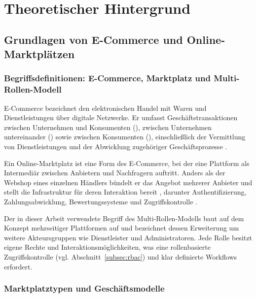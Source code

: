 \chapter{Theoretischer Hintergrund}
\label{chap:theoretischer-hintergrund}

\section{Grundlagen von E-Commerce und Online-Marktplätzen}
\label{sec:grundlagen-ecommerce}

\subsection{Begriffsdefinitionen: E-Commerce, Marktplatz und
Multi-Rollen-Modell}
\label{subsec:begriffe}

E-Commerce bezeichnet den elektronischen Handel mit Waren und
Dienstleistungen über digitale Netzwerke. Er umfasst
Geschäftstransaktionen zwischen Unternehmen und Konsumenten
(), zwischen Unternehmen untereinander ()
sowie zwischen Konsumenten (), einschließlich der
Vermittlung von Dienstleistungen und der Abwicklung zugehöriger
Geschäftsprozesse \cite{turban_ecommerce}.

Ein Online-Marktplatz ist eine Form des E-Commerce, bei der eine
Plattform als Intermediär zwischen Anbietern und Nachfragern auftritt.
Anders als der Webshop eines einzelnen Händlers bündelt er das Angebot
mehrerer Anbieter und stellt die Infrastruktur für deren Interaktion
bereit \cite{taeuscher_platform_models}, darunter Authentifizierung,
Zahlungsabwicklung, Bewertungssysteme und Zugriffskontrolle
\cite{tiwana_platform_ecosystems,hein_platform_ecosystems}.

Der in dieser Arbeit verwendete Begriff des Multi-Rollen-Modells baut
auf dem Konzept mehrseitiger Plattformen auf
\cite{hein_platform_ecosystems, tiwana_platform_ecosystems} und
bezeichnet dessen Erweiterung um weitere Akteursgruppen wie
Dienstleister und Administratoren. Jede Rolle besitzt eigene Rechte
und Interaktionsmöglichkeiten, was eine rollenbasierte
Zugriffskontrolle (vgl. Abschnitt~\ref{subsec:rbac}) und klar
definierte Workflows erfordert.


\subsection{Marktplatztypen und Geschäftsmodelle}
\label{subsec:marktplatztypen}

